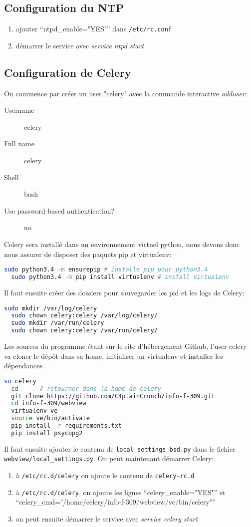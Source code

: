 \documentclass[10pt,a4paper]{article}
\begin{document}
\subsection{Configuration du NTP}
\begin{enumerate}
  \item ajouter ``ntpd\_enable="YES"'' dans \texttt{/etc/rc.conf}
  \item démarrer le service avec \emph{service ntpd start}
\end{enumerate}

\subsection{Configuration de Celery}
On commence par créer un user "celery" avec la commande interactive \emph{adduser}:
\begin{description}
  \item[Username] celery
  \item[Full name] celery
  \item[Shell] bash
  \item[Use password-based authentication?] no
\end{description}
Celery sera installé dans un environnement virtuel python, nous devons donc nous assurer de disposer des paquets pip et virtualenv:
\begin{lstlisting}[language=bash]
  sudo python3.4 -m ensurepip # installe pip pour python3.4
  sudo python3.4 -m pip install virtualenv # install virtualenv
\end{lstlisting}
Il faut ensuite créer des dossiers pour sauvegarder les pid et les logs de Celery:
\begin{lstlisting}[language=bash]
  sudo mkdir /var/log/celery
  sudo chown celery:celery /var/log/celery/
  sudo mkdir /var/run/celery
  sudo chown celery:celery /var/run/celery/
\end{lstlisting}
Les sources du programme étant sur le site d'hébergement Github, l'user celery va cloner le dépôt dans sa home, initialiser un virtualenv et installer les dépendances.
\begin{lstlisting}[language=bash]
  su celery
  cd      # retourner dans la home de celery
  git clone https://github.com/C4ptainCrunch/info-f-309.git
  cd info-f-309/webview
  virtualenv ve
  source ve/bin/activate
  pip install -r requirements.txt
  pip install psycopg2
\end{lstlisting}

Il faut ensuite ajouter le contenu de \texttt{local\_settings\_bsd.py} dans le fichier \texttt{webview/local\_settings.py}. %
On peut maintenant démarrer Celery:
\begin{enumerate}
  \item à \texttt{/etc/rc.d/celery} on ajoute le contenu de \texttt{celery-rc.d} %
  \item à \texttt{/etc/rc.d/celery}, on ajoute les lignes ``celery\_enable="YES"'' et ``celery\_cmd="/home/celery/info-f-309/webview/ve/bin/celery"''
  \item on peut ensuite démarrer le service avec \emph{service celery start}
\end{enumerate}
\end{document}
